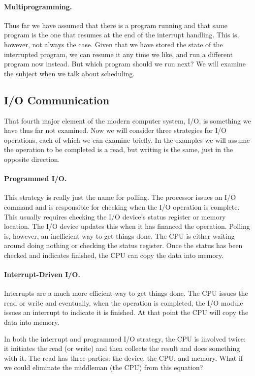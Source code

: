 \paragraph{Multiprogramming.} Thus far we have assumed that there is a program running and that same program is the one that resumes at the end of the interrupt handling. This is, however, not always the case. Given that we have stored the state of the interrupted program, we can resume it any time we like, and run a different program now instead. But which program should we run next? We will examine the subject when we talk about scheduling.

\subsection*{I/O Communication}
That fourth major element of the modern computer system, I/O, is something we have thus far not examined. Now we will consider three strategies for I/O operations, each of which we can examine briefly. In the examples we will assume the operation to be completed is a read, but writing is the same, just in the opposite direction.

\paragraph{Programmed I/O.}  This strategy is really just the name for polling. The processor issues an I/O command and is responsible for checking when the I/O operation is complete. This usually requires checking the I/O device's status register or memory location. The I/O device updates this when it has financed the operation. Polling is, however, an inefficient way to get things done. The CPU is either waiting around doing nothing or checking the status register. Once the status has been checked and indicates finished, the CPU can copy the data into memory.

\paragraph{Interrupt-Driven I/O.} Interrupts are a much more efficient way to get things done. The CPU issues the read or write and eventually, when the operation is completed, the I/O module issues an interrupt to indicate it is finished. At that point the CPU will copy the data into memory.

In both the interrupt and programmed I/O strategy, the CPU is involved twice: it initiates the read (or write) and then collects the result and does something with it. The read has three parties: the device, the CPU, and memory. What if we could eliminate the middleman (the CPU) from this equation?


